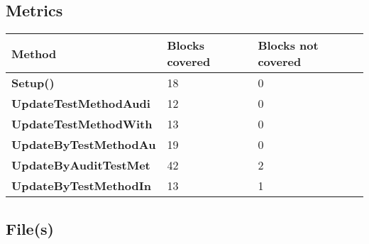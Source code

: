 \documentclass[a4paper,10pt]{article}
\begin{document}
\subsection{Metrics}
\begin{longtable}[l]{|l|l|l|}
\hline
\textbf{Method} & \textbf{Blocks covered} & \textbf{Blocks not covered}\\
\hline
\textbf{Setup()} & 18 & 0\\
\hline
\textbf{UpdateTestMethodAudi} & 12 & 0\\
\hline
\textbf{UpdateTestMethodWith} & 13 & 0\\
\hline
\textbf{UpdateByTestMethodAu} & 19 & 0\\
\hline
\textbf{UpdateByAuditTestMet} & 42 & 2\\
\hline
\textbf{UpdateByTestMethodIn} & 13 & 1\\
\hline
\end{longtable}
\subsection{File(s)}
\end{document}
